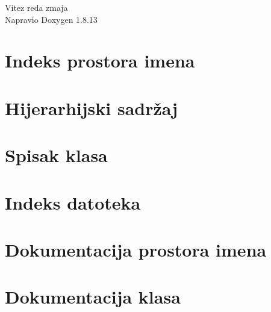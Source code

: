 \documentclass[twoside]{book}
\newcommand{\+}{\discretionary{\mbox{\scriptsize$\hookleftarrow$}}{}{}}
\newcommand{\clearemptydoublepage}{%
  \newpage{\pagestyle{empty}\cleardoublepage}%
}
\begin{document}
\hypersetup{pageanchor=false,
             bookmarksnumbered=true,
             pdfencoding=unicode
            }
\begin{titlepage}
\vspace*{7cm}
\begin{center}%
{\Large Vitez reda zmaja }\\
\vspace*{1cm}
{\large Napravio Doxygen 1.8.13}\\
\end{center}
\end{titlepage}
\clearemptydoublepage
{}
\tableofcontents
\clearemptydoublepage
{}
\hypersetup{pageanchor=true}

\chapter{Indeks prostora imena}

\chapter{Hijerarhijski sadržaj}

\chapter{Spisak klasa}

\chapter{Indeks datoteka}

\chapter{Dokumentacija prostora imena}







\chapter{Dokumentacija klasa}






























\end{document}
